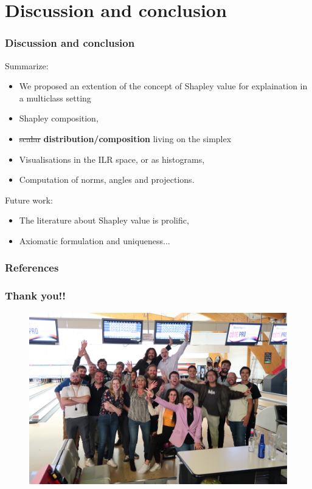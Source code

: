 \documentclass{beamer}
\begin{document}
\section{Discussion and conclusion}

\begin{frame}
\frametitle{Discussion and conclusion}
Summarize:
\begin{itemize}
\item We proposed an extention of the concept of Shapley value for explaination in a multiclass setting
\pause
\item Shapley composition,
\pause
\item \st{scalar} \textbf{distribution/composition} living on the simplex
  \pause
\item Visualisations in the ILR space, or as histograms,
  \pause
  \item Computation of norms, angles and projections.
\end{itemize}

\pause
\vspace{0.2cm}
Future work:
\begin{itemize}
\item The literature about Shapley value is prolific,
\pause
\item Axiomatic formulation and uniqueness...
\end{itemize}
\end{frame}


\begin{frame}[t,allowframebreaks]
   \frametitle{References}
    \printbibliography
  \end{frame}


\begin{frame}
\frametitle{Thank you!!}
\begin{figure}\centering
  \includegraphics[width=0.6\linewidth]{bowling.JPG}
\end{figure}


\end{frame}
\end{document}
